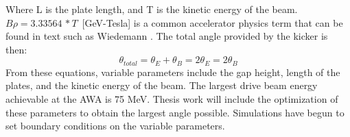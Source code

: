 \documentclass{iitthesis}
\begin{document}
Where L is the plate length, and T is the kinetic energy of the beam. $B\rho=3.33564\,*T\,$ [GeV-Tesla] is a 
common accelerator physics term that can be found in text such as Wiedemann \cite{Wiedemann}. 
The total angle provided by the kicker is then: 
\begin{equation}
\theta_{total}= \theta_E+\theta_B=2\theta_E=2\theta_B
\end{equation}
From these equations, variable parameters include the gap height, length of the plates, and 
the kinetic energy of the beam. The largest drive beam energy achievable at the AWA is 75 MeV. 
Thesis work will include the optimization of these parameters to obtain the largest angle possible.
Simulations have begun to set boundary conditions on the variable parameters. 




 \label{sec:uvoptics}
\end{document}

